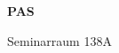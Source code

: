 \documentclass[a4paper]{article}
\begin{document}
\printGenericVSLHeader
\begin{center}
\begin{vsltext}{3cm}{4cm}

   \vspace{0.5cm} 

    \textbf{PAS} 

    \vspace{1.5cm}

    Seminarraum 138A

\end{vsltext}

\end{center}
\end{document}
